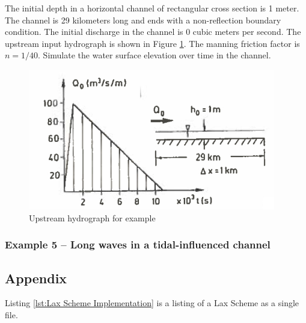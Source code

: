 The initial depth in a horizontal channel of rectangular cross section is 1 meter.
The channel is 29 kilometers long and ends with a non-reflection boundary condition.
The initial discharge in the channel is 0 cubic meters per second.
The upstream input hydrograph is shown in Figure \ref{fig:upstreamHydro}.
The manning friction factor is $n=1/40$.  
Simulate the water surface elevation over time in the channel.

\begin{figure}[h!] %
   \centering
   \includegraphics[width=4.25in]{upstreamHydro.jpg} 
   \caption{Upstream hydrograph for example}
   \label{fig:upstreamHydro}
\end{figure}



\subsubsection{Example 5 -- Long waves in a tidal-influenced channel}


\subsection{Appendix}
Listing \ref{lst:Lax Scheme Implementation} is a listing of a Lax Scheme as a single file.

